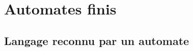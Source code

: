 % 
%
%
%
% 
%
%
%
% 
%
%
%
%
% 
%
%
% 
\section{Automates finis}
 
%
%
%
%
% 
%
%
%
%
%
 
\subsection{Langage reconnu par un automate}








 
